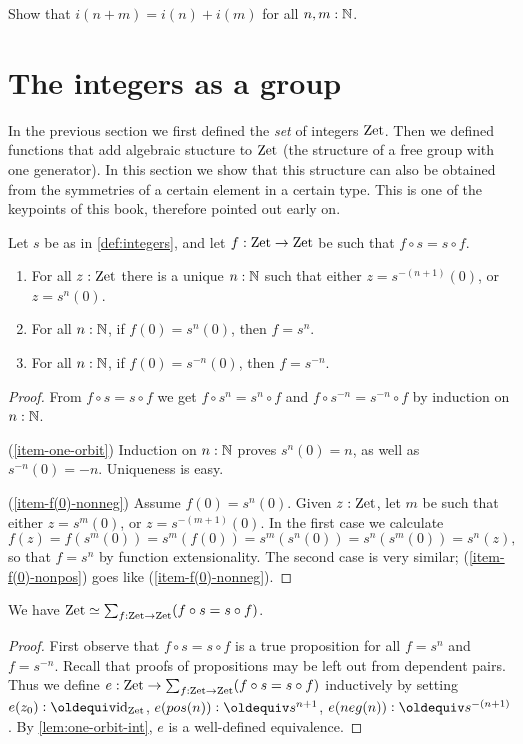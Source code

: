 \documentclass[a4,12pt]{amsart}
\begin{document}
\begin{xca}\label{xca:addition-on-Z-and-N}
Show that $i(n+m)=i(n)+i(m)$ for all $n,m:\mathbb{N}$.
\end{xca}


\section{The integers as a group}
\label{sec:integers-group}

In the previous section we first defined the \emph{set}
of integers $\mathrm{Zet}$. Then we defined functions that add
algebraic stucture to $\mathrm{Zet}$ (the structure of a free group 
with one generator). In this section we
show that this structure can also be obtained from the
symmetries of a certain element in a certain type.
This is one of the keypoints of this book, 
therefore pointed out early on.

\begin{lemma}\label{lem:one-orbit-int}
Let $s$ be as in \cref{def:integers}, and 
let $f:\mathrm{Zet}\to\mathrm{Zet}$ be such that $f\circ s = s\circ f$. 
  \begin{enumerate}
  \item\label{item-one-orbit} For all $z:\mathrm{Zet}$ there is a unique $n:\mathbb{N}$
such that either $z=s^{-(n+1)}(0)$, or $z=s^{n}(0)$.
  \item\label{item-f(0)-nonneg} For all $n:\mathbb{N}$, if $f(0)=s^{n}(0)$, then $f=s^{n}$.
  \item\label{item-f(0)-nonpos} For all $n:\mathbb{N}$, if $f(0)=s^{-n}(0)$, then $f=s^{-n}$.
  \end{enumerate}
\end{lemma}
\begin{proof}
From $f\circ s = s\circ f$ we get $f\circ s^n = s^n\circ f$
and $f\circ s^{-n} = s^{-n}\circ f$ by induction on $n:\mathbb{N}$.

(\ref{item-one-orbit}) Induction on $n:\mathbb{N}$ proves $s^{n}(0)=n$, 
as well as $s^{-n}(0)=-n$. Uniqueness is easy.

(\ref{item-f(0)-nonneg}) Assume $f(0)=s^{n}(0)$.  
Given $z:\mathrm{Zet}$, let $m$ be such that either $z=s^{m}(0)$, 
or $z=s^{-(m+1)}(0)$. In the first case we calculate
\[
f(z)=f(s^{m}(0))=s^{m}(f(0))=s^{m}(s^{n}(0))=s^{n}(s^{m}(0))= s^{n}(z),
\]
so that $f=s^{n}$ by function extensionality. 
The second case is very similar;
(\ref{item-f(0)-nonpos}) goes like (\ref{item-f(0)-nonneg}).
\end{proof}

\begin{corollary}\label{cor:pre-torsor-int}
We have $\mathrm{Zet}\simeq \sum_{f:\mathrm{Zet}\to\mathrm{Zet}} (f\circ s = s\circ f)$.
\end{corollary}
\begin{proof}
First observe that $f\circ s = s\circ f$ is a true proposition
for all $f=s^n$ and $f=s^{-n}$. Recall that proofs of propositions
may be left out from dependent pairs. Thus we
define $e : \mathrm{Zet}\to \sum_{f:\mathrm{Zet}\to\mathrm{Zet}} (f\circ s = s\circ f)$ 
inductively by setting 
$e(z_0)\defeq \id_\zet$, 
$e(pos(n))\defeq s^{n+1}$,
$e(neg(n))\defeq s^{-(n+1)}$.
By \cref{lem:one-orbit-int}, $e$ is a well-defined equivalence.
\end{proof}
\end{document}
